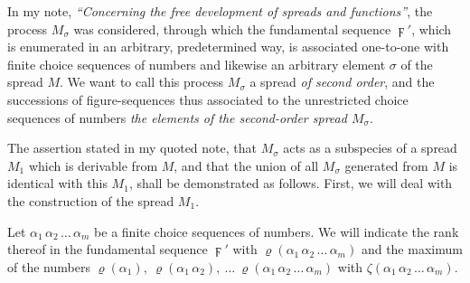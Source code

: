 \documentclass{amsart}
\newcommand\Rank[1]{\varrho\left(#1\right)}
\newcommand\Max[1]{\zeta\left(#1\right)}
\begin{document}


In my note, \emph{``Concerning the free development of spreads and
functions''}, the process $M_\sigma$ was considered, through which
the fundamental sequence $\digamma'$, which is enumerated in an arbitrary,
predetermined way, is associated one-to-one with finite choice sequences of
numbers and likewise an arbitrary element $\sigma$ of the spread $M$. We want to call this process $M_\sigma$ a
spread \emph{of second order}, and the successions of figure-sequences thus
associated to the unrestricted choice sequences of numbers  \emph{the elements of the second-order spread $M_\sigma$}.

The assertion stated in my quoted note, that $M_\sigma$ acts as a subspecies of
a spread $M_1$ which is derivable from $M$, and that the union of all
$M_\sigma$ generated from $M$ is identical with this $M_1$, shall be
demonstrated as follows. First, we will deal with the construction of the
spread $M_1$.

Let $\alpha_1\, \alpha_2\, \dots\, \alpha_m$ be a finite choice sequences of
numbers. We will indicate the rank thereof in the fundamental sequence
$\digamma'$ with $\Rank{\alpha_1\,\alpha_2\,\dots\,\alpha_m}$ and the maximum
of the numbers $\Rank{\alpha_1},\ \Rank{\alpha_1\,\alpha_2},\ \dots\
\Rank{\alpha_1\,\alpha_2\,\dots\,\alpha_m}$ with
$\Max{\alpha_1\,\alpha_2\,\dots\,\alpha_m}$.
\end{document}
